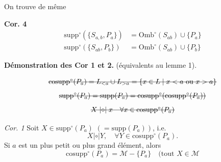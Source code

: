 \documentclass[11pt,a4paper]{article}
\begin{document}
On trouve de même

\textbf{Cor. 4}
\[
\begin{aligned}
\mathrm{supp}^\circ(\{S_{a,b}, P_a\}) &= \mathrm{Omb}^\circ(S_{ab}) \cup \{P_a\}\\
\mathrm{supp}^\circ(\{S_{ab}, P_b\}) &= \mathrm{Omb}^\circ(S_{ab}) \cup \{P_b\}
\end{aligned}
\]

\textbf{Démonstration des Cor 1 et 2.} (équivalents au lemme 1).

\[
\text{\struck{$\mathrm{cosupp}^\circ(P_a) = L_{<a}\cup L_{>a} = \{x\in L \mid x<a \text{ ou } x>a\}$}}
\]
\[
\text{\struck{$\mathrm{supp}^\circ(P_a) = \mathrm{supp}(P_a) = \mathrm{cosupp}^\circ(\mathrm{cosupp}^\circ(P_a))$}}
\]
\[
\text{\struck{$X \mathrel{|{\circ}|} x \quad \forall x\in\mathrm{cosupp}^\circ(P_a)$}}
\]

\emph{Cor. 1} Soit $X \in \mathrm{supp}^\circ(P_a)$ $(= \mathrm{supp}(P_a))$, i.e.
\[
X \mathrel{|{\circ}|} Y, \quad \forall Y\in\mathrm{cosupp}^\circ(P_a) .
\]
Si $a$ est un plus petit ou plus grand élément, alors
\[
\mathrm{cosupp}^\circ(P_a) = \mathcal{M} - \{P_a\} \quad (\text{tout } X\in\mathcal{M}
\]
\end{document}
